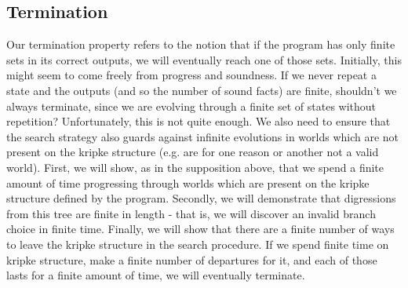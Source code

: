 \subsection{Termination}
\label{sec:term} 
Our termination property refers to the notion that if the program has only finite sets in its correct outputs, we will eventually reach one of those sets.
Initially, this might seem to come freely from progress and soundness.
If we never repeat a state and the outputs (and so the number of sound facts) are finite, shouldn't we always terminate, since we are evolving through a finite set of states without repetition?
Unfortunately, this is not quite enough.
We also need to ensure that the search strategy also guards against infinite evolutions in worlds which are not present on the kripke structure (e.g. are for one reason or another not a valid world).
First, we will show, as in the supposition above, that we spend a finite amount of time progressing through worlds which are present on the kripke structure defined by the program.
Secondly, we will demonstrate that digressions from this tree are finite in length - that is, we will discover an invalid branch choice in finite time.
Finally, we will show that there are a finite number of ways to leave the kripke structure in the search procedure. 
If we spend finite time on kripke structure, make a finite number of departures for it, and each of those lasts for a finite amount of time, we will eventually terminate.

